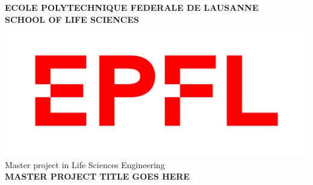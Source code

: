 \setmainfont{Arial}
\begin{titlepage}
\center %


\textbf{\large ECOLE POLYTECHNIQUE FEDERALE DE LAUSANNE}\\ %
\textbf{\large SCHOOL OF LIFE SCIENCES}\\[0.5cm] %
\includegraphics[scale=0.33]{img/epfl_logo.png}\\[1.25cm] %
\large{Master project in Life Sciences Engineering}\\[1.25cm] %


\textbf{\Large \textbf{MASTER PROJECT TITLE GOES HERE}}\\[2cm]




\end{titlepage}
